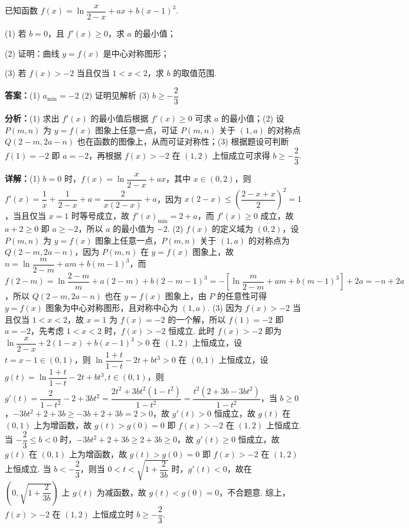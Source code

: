\begin{question}[points=17]
已知函数 $f(x)=\ln\dfrac{x}{2-x}+ax+b(x-1)^3$.

(1) 若 $b=0$，且 $f'(x)\ge 0$，求 $a$ 的最小值；

(2) 证明：曲线 $y=f(x)$ 是中心对称图形；

(3) 若 $f(x)>-2$ 当且仅当 $1<x<2$，求 $b$ 的取值范围.
\begin{solution}
\textbf{答案：}(1) $a_{\min}=-2$ (2) 证明见解析 (3) $b\ge -\dfrac{2}{3}$

\textbf{分析：}(1) 求出 $f'(x)$ 的最小值后根据 $f'(x)\ge 0$ 可求 $a$ 的最小值；(2) 设 $P(m,n)$ 为 $y=f(x)$ 图象上任意一点，可证 $P(m,n)$ 关于 $(1,a)$ 的对称点 $Q(2-m,2a-n)$ 也在函数的图像上，从而可证对称性；(3) 根据题设可判断 $f(1)=-2$ 即 $a=-2$，再根据 $f(x)>-2$ 在 $(1,2)$ 上恒成立可求得 $b\ge -\dfrac{2}{3}$.

\textbf{详解：}(1) $b=0$ 时，$f(x)=\ln\dfrac{x}{2-x}+ax$，其中 $x\in(0,2)$，则 $f'(x)=\dfrac{1}{x}+\dfrac{1}{2-x}+a=\dfrac{2}{x(2-x)}+a$，因为 $x(2-x)\le\left(\dfrac{2-x+x}{2}\right)^2=1$，当且仅当 $x=1$ 时等号成立，故 $f'(x)_{\min}=2+a$，而 $f'(x)\ge 0$ 成立，故 $a+2\ge 0$ 即 $a\ge -2$，所以 $a$ 的最小值为 $-2$.
(2) $f(x)$ 的定义域为 $(0,2)$，设 $P(m,n)$ 为 $y=f(x)$ 图象上任意一点，$P(m,n)$ 关于 $(1,a)$ 的对称点为 $Q(2-m,2a-n)$，因为 $P(m,n)$ 在 $y=f(x)$ 图象上，故 $n=\ln\dfrac{m}{2-m}+am+b(m-1)^3$，而 $f(2-m)=\ln\dfrac{2-m}{m}+a(2-m)+b(2-m-1)^3=-\left[\ln\dfrac{m}{2-m}+am+b(m-1)^3\right]+2a=-n+2a$，所以 $Q(2-m,2a-n)$ 也在 $y=f(x)$ 图象上，由 $P$ 的任意性可得 $y=f(x)$ 图象为中心对称图形，且对称中心为 $(1,a)$.
(3) 因为 $f(x)>-2$ 当且仅当 $1<x<2$，故 $x=1$ 为 $f(x)=-2$ 的一个解，所以 $f(1)=-2$ 即 $a=-2$，先考虑 $1<x<2$ 时，$f(x)>-2$ 恒成立. 此时 $f(x)>-2$ 即为 $\ln\dfrac{x}{2-x}+2(1-x)+b(x-1)^3>0$ 在 $(1,2)$ 上恒成立，设 $t=x-1\in(0,1)$，则 $\ln\dfrac{1+t}{1-t}-2t+bt^3>0$ 在 $(0,1)$ 上恒成立，设 $g(t)=\ln\dfrac{1+t}{1-t}-2t+bt^3, t\in(0,1)$，则 $g'(t)=\dfrac{2}{1-t^2}-2+3bt^2=\dfrac{2t^2+3bt^2(1-t^2)}{1-t^2}=\dfrac{t^2(2+3b-3bt^2)}{1-t^2}$，当 $b\ge 0$，$-3bt^2+2+3b\ge -3b+2+3b=2>0$，故 $g'(t)>0$ 恒成立，故 $g(t)$ 在 $(0,1)$ 上为增函数，故 $g(t)>g(0)=0$ 即 $f(x)>-2$ 在 $(1,2)$ 上恒成立. 当 $-\dfrac{2}{3}\le b<0$ 时，$-3bt^2+2+3b\ge 2+3b\ge 0$，故 $g'(t)\ge 0$ 恒成立，故 $g(t)$ 在 $(0,1)$ 上为增函数，故 $g(t)>g(0)=0$ 即 $f(x)>-2$ 在 $(1,2)$ 上恒成立. 当 $b<-\dfrac{2}{3}$，则当 $0<t<\sqrt{1+\dfrac{2}{3b}}$ 时，$g'(t)<0$，故在 $\left(0,\sqrt{1+\dfrac{2}{3b}}\right)$ 上 $g(t)$ 为减函数，故 $g(t)<g(0)=0$，不合题意. 综上，$f(x)>-2$ 在 $(1,2)$ 上恒成立时 $b\ge -\dfrac{2}{3}$.
\end{solution}
\end{question}

